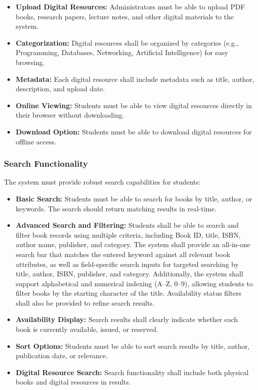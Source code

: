\documentclass[12pt,a4paper]{report}
\begin{document}
\begin{itemize}
    \item \textbf{Upload Digital Resources:} Administrators must be able to upload PDF books, research papers, lecture notes, and other digital materials to the system.
    
    \item \textbf{Categorization:} Digital resources shall be organized by categories (e.g., Programming, Databases, Networking, Artificial Intelligence) for easy browsing.
    
    \item \textbf{Metadata:} Each digital resource shall include metadata such as title, author, description, and upload date.
    
    \item \textbf{Online Viewing:} Students must be able to view digital resources directly in their browser without downloading.
    
    \item \textbf{Download Option:} Students must be able to download digital resources for offline access.
    
\end{itemize}

\subsubsection{Search Functionality}

The system must provide robust search capabilities for students:

\begin{itemize}
    \item \textbf{Basic Search:} Students must be able to search for books by title, author, or keywords. The search should return matching results in real-time.
    
   \item \textbf{Advanced Search and Filtering:} Students shall be able to search and filter book records using multiple criteria, including Book ID, title, ISBN, author name, publisher, and category. The system shall provide an all-in-one search bar that matches the entered keyword against all relevant book attributes, as well as field-specific search inputs for targeted searching by title, author, ISBN, publisher, and category. Additionally, the system shall support alphabetical and numerical indexing (A--Z, 0--9), allowing students to filter books by the starting character of the title. Availability status filters shall also be provided to refine search results.
    
    \item \textbf{Availability Display:} Search results shall clearly indicate whether each book is currently available, issued, or reserved.
    
    \item \textbf{Sort Options:} Students must be able to sort search results by title, author, publication date, or relevance.
    
    \item \textbf{Digital Resource Search:} Search functionality shall include both physical books and digital resources in results.
\end{itemize}
\end{document}
